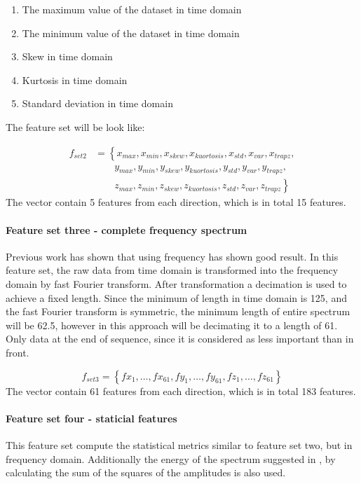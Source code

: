 \documentclass[USenglish]{ifimaster}  %
\begin{document}
	
	\begin{enumerate}
		\item The maximum value of the dataset in time domain
		\item The minimum value of the dataset in time domain
		\item Skew in time domain
		\item Kurtosis in time domain 
		\item Standard deviation in time domain
	\end{enumerate}
	
	The feature set will be look like:
	
	\begin{align}
	f_{set2} &= \left\{ x_{max},x_{min},x_{skew},x_{kuortosis},x_{std},x_{var},x_{trapz}, \right.\nonumber\\
	&\qquad \left. {} y_{max},y_{min},y_{skew},y_{kuortosis},y_{std},y_{var},y_{trapz}, \right.\nonumber\\
	&\qquad \left. {} z_{max},z_{min},z_{skew},z_{kuortosis},z_{std},z_{var},z_{trapz} \right\}
	\end{align}
	The vector contain 5 features from each direction, which is in total 15 features. 
	
	\paragraph{Feature set three - complete frequency spectrum} Previous work has shown that using frequency has shown good result. In this feature set, the raw data from time domain is transformed into the frequency domain by fast Fourier transform. After transformation a decimation is used to achieve a fixed length. Since the minimum of length in time domain is 125, and the fast Fourier transform is symmetric, the minimum length of entire spectrum will be 62.5, however in this approach will be decimating it to a length of 61. Only data at the end of sequence, since it is considered as less important than in front. 
	
	
	\begin{equation} \label{eq:f2}
	f_{set3}= \left\{ fx_1,\dotsc,fx_{61},fy_1, \dotsc,fy_{61},fz_1,\dotsc,fz_{61} \right\}
	\end{equation}
	The vector contain 61 features from each direction, which is in total 183 features. 
	
	\paragraph{Feature set four - staticial features} This feature set compute the statistical metrics similar to feature set two, but in frequency domain. Additionally the energy of the spectrum suggested in \cite{26b23e912c654fe4b7478fd910130195}, by calculating the sum of the squares of the amplitudes is also used.
	
\end{document}
